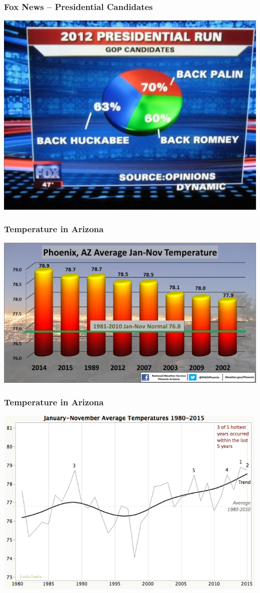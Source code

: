 \documentclass{beamer} %
\begin{document}
\begin{frame}\frametitle{Fox News -- Presidential Candidates}
	\centering
	\includegraphics[width=0.8\linewidth]{foxnews.jpg}
\end{frame}


\begin{frame}\frametitle{Temperature in Arizona}
	\centering
	\includegraphics[width=0.9\linewidth]{temp.png}
\end{frame}


\begin{frame}\frametitle{Temperature in Arizona}
	\centering
	\includegraphics[width=0.9\linewidth]{temp2.png}
\end{frame}
\end{document}
